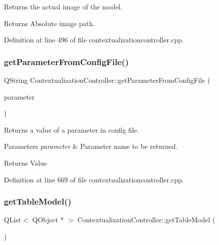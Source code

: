 Returns the actual image of the model. 

\begin{DoxyReturn}{Returns}
Absolute image path. 
\end{DoxyReturn}


Definition at line 496 of file contextualizationcontroller.\+cpp.

\mbox{\label{classContextualizationController_a5d60cf7ca2c78b74bb6a5ad5a5b04e9e}} 
\subsubsection{\texorpdfstring{get\+Parameter\+From\+Config\+File()}{getParameterFromConfigFile()}}
{\footnotesize\ttfamily Q\+String Contextualization\+Controller\+::get\+Parameter\+From\+Config\+File (\begin{DoxyParamCaption}\item[{const Q\+String}]{parameter }\end{DoxyParamCaption})\hspace{0.3cm}{\ttfamily [protected]}}



Returns a value of a parameter in config file. 


\begin{DoxyParams}{Parameters}
{\em parameter} & Parameter name to be returned. \\
\hline
\end{DoxyParams}
\begin{DoxyReturn}{Returns}
Value 
\end{DoxyReturn}


Definition at line 669 of file contextualizationcontroller.\+cpp.

\mbox{\label{classContextualizationController_a6c8aba56f5b97fc3042c6e5c8e04e124}} 
\subsubsection{\texorpdfstring{get\+Table\+Model()}{getTableModel()}}
{\footnotesize\ttfamily Q\+List$<$ Q\+Object $\ast$ $>$ Contextualization\+Controller\+::get\+Table\+Model (\begin{DoxyParamCaption}{ }\end{DoxyParamCaption})\hspace{0.3cm}{\ttfamily [protected]}}



